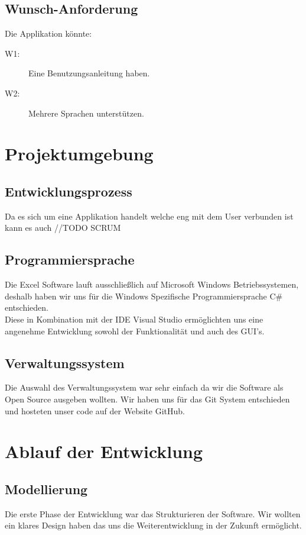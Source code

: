\documentclass{article}
\begin{document}
\subsection{Wunsch-Anforderung}
Die Applikation könnte:
\begin{description}
	\item[W1:] Eine Benutzungsanleitung haben.
	\item[W2:] Mehrere Sprachen unterstützen.
\end{description}

\newpage

\section{Projektumgebung}
\vspace{5mm}
\subsection{Entwicklungsprozess	}
Da es sich um eine Applikation handelt welche eng mit dem User verbunden ist kann es auch //TODO SCRUM

\subsection{Programmiersprache}
Die Excel Software lauft ausschließlich auf Microsoft Windows Betriebssystemen, deshalb haben wir uns für die Windows Spezifische Programmiersprache C\# entschieden. \\ Diese in Kombination mit der IDE Visual Studio ermöglichten uns eine angenehme Entwicklung sowohl der Funktionalität und auch des GUI's.
 

\subsection{Verwaltungssystem}
Die Auswahl des Verwaltungssystem war sehr einfach da wir die Software als Open Source ausgeben wollten. Wir haben uns für das Git System entschieden und hosteten unser code auf der Website GitHub.

\newpage

\section{Ablauf der Entwicklung}
\subsection{Modellierung}
Die erste Phase der Entwicklung war das Strukturieren der Software. Wir wollten ein klares Design haben das uns die Weiterentwicklung in der Zukunft ermöglicht. 
\end{document}
